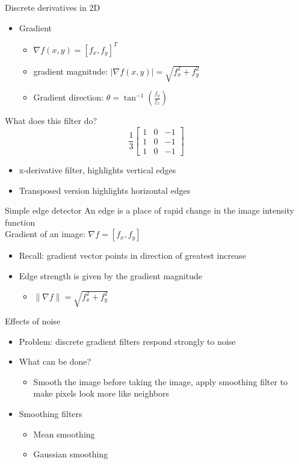 Discrete derivatives in 2D
\begin{itemize}
    \item Gradient
    \begin{itemize}
        \item $\nabla f(x,y) = [f_x, f_y]^T$
        \item gradient magnitude: $\left | \nabla f(x,y)\right | = \sqrt{f_x^2+f_y^2}$
        \item Gradient direction: $\theta = \tan^{-1}\left(\frac{f_y}{f_x}\right)$
    \end{itemize}
\end{itemize}
What does this filter do?
\[\frac{1}{3}\begin{bmatrix}
    1&0&-1\\
    1&0&-1\\
    1&0&-1
\end{bmatrix}\]
\begin{itemize}
    \item x-derivative filter, highlights vertical edges
    \item Transposed version highlights horizontal edges
\end{itemize}
Simple edge detector
An edge is a place of rapid change in the image intensity function\vspace{0.15in}\\
Gradient of an image: $\nabla f = [f_x, f_y]$
\begin{itemize}
    \item Recall: gradient vector points in direction of greatest increase
    \item Edge strength is given by the gradient magnitude
    \begin{itemize}
        \item $\|\nabla f\| = \sqrt{f_x^2+f_y^2}$
    \end{itemize}
\end{itemize}
Effects of noise
\begin{itemize}
    \item Problem: discrete gradient filters respond strongly to noise
    \item What can be done?
    \begin{itemize}
        \item Smooth the image before taking the image, apply smoothing filter to make pixels look more like neighbors
    \end{itemize}
    \item Smoothing filters
    \begin{itemize}
        \item Mean smoothing
        \item Gaussian smoothing
    \end{itemize}
\end{itemize}
